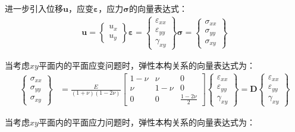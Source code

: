 进一步引入位移$\pmb{u}$，应变$\pmb{\varepsilon}$，应力$\pmb{\sigma}$的向量表达式：
\begin{equation}
\begin{split}
    \pmb{u}=\left\{\begin{matrix} u_x\\u_y\end{matrix}\right\}
    \pmb{\varepsilon}=\left\{\begin{matrix}  
        \varepsilon_{xx}\\\varepsilon_{yy}\\\gamma_{xy}
    \end{matrix}\right\}
    \pmb{\sigma}=\left\{\begin{matrix}
        \sigma_{xx}\\\sigma_{yy}\\\sigma_{xy}
    \end{matrix}\right\}
\end{split}
\end{equation}\par
当考虑$xy$平面内的平面应变问题时，弹性本构关系的向量表达式为：
\begin{equation}
\begin{split}
    \left\{\begin{matrix}
        \sigma_{xx}\\\sigma_{yy}\\\sigma_{xy}
    \end{matrix}\right\}&=\frac{E}{(1+\nu)(1-2\nu)}
    \left[\begin{matrix}
        1-\nu&\nu&0\\\nu&1-\nu&0\\0&0&\frac{1-2\nu}{2}
    \end{matrix}\right]
    \left\{\begin{matrix}
        \varepsilon_{xx}\\\varepsilon_{yy}\\\gamma_{xy}
    \end{matrix}\right\}
    =\pmb{D}\left\{\begin{matrix}\varepsilon_{xx}\\\varepsilon_{yy}\\\gamma_{xy}\end{matrix}\right\}
\end{split}
\end{equation}\par
当考虑$xy$平面内的平面应力问题时，弹性本构关系的向量表达式为：
